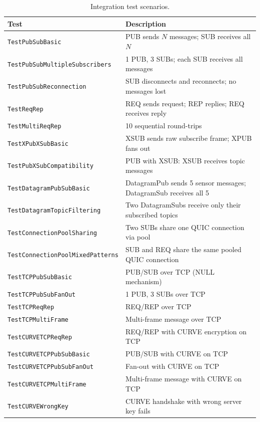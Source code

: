 \documentclass[12pt, a4paper, oneside]{report}
\begin{document}
\begin{table}[H]
  \centering
  \caption{Integration test scenarios.}
  \label{tab:integration-tests}
  \begin{tabularx}{\textwidth}{lX}
    \toprule
    \textbf{Test} & \textbf{Description} \\
    \midrule
    \texttt{TestPubSubBasic}        & PUB sends $N$ messages; SUB receives all $N$ \\
    \texttt{TestPubSubMultipleSubscribers} & 1 PUB, 3 SUBs; each SUB receives all messages \\
    \texttt{TestPubSubReconnection} & SUB disconnects and reconnects; no messages lost \\
    \texttt{TestReqRep}             & REQ sends request; REP replies; REQ receives reply \\
    \texttt{TestMultiReqRep}        & 10 sequential round-trips \\
    \texttt{TestXPubXSubBasic}      & XSUB sends raw subscribe frame; XPUB fans out \\
    \texttt{TestPubXSubCompatibility} & PUB with XSUB: XSUB receives topic messages \\
    \texttt{TestDatagramPubSubBasic} & DatagramPub sends 5 sensor messages; DatagramSub receives all 5 \\
    \texttt{TestDatagramTopicFiltering} & Two DatagramSubs receive only their subscribed topics \\
    \texttt{TestConnectionPoolSharing} & Two SUBs share one QUIC connection via pool \\
    \texttt{TestConnectionPoolMixedPatterns} & SUB and REQ share the same pooled QUIC connection \\
    \texttt{TestTCPPubSubBasic}     & PUB/SUB over TCP (NULL mechanism) \\
    \texttt{TestTCPPubSubFanOut}    & 1 PUB, 3 SUBs over TCP \\
    \texttt{TestTCPReqRep}          & REQ/REP over TCP \\
    \texttt{TestTCPMultiFrame}      & Multi-frame message over TCP \\
    \texttt{TestCURVETCPReqRep}     & REQ/REP with CURVE encryption on TCP \\
    \texttt{TestCURVETCPPubSubBasic} & PUB/SUB with CURVE on TCP \\
    \texttt{TestCURVETCPPubSubFanOut} & Fan-out with CURVE on TCP \\
    \texttt{TestCURVETCPMultiFrame} & Multi-frame message with CURVE on TCP \\
    \texttt{TestCURVEWrongKey}      & CURVE handshake with wrong server key fails \\
    \bottomrule
  \end{tabularx}
\end{table}
\end{document}
